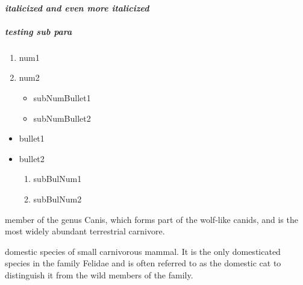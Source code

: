 \documentclass[a4paper, 12pt]{report}
\begin{document}
\paragraph{\textit{italicized and even more \textit{italicized}}}
\subparagraph{testing sub para}

\begin{enumerate}
    \item num1
    \item num2
    \begin{itemize}
        \item subNumBullet1
        \item subNumBullet2
    \end{itemize}
\end{enumerate}

\begin{itemize}
    \item bullet1
    \item bullet2
        \begin{enumerate}
            \item subBulNum1
            \item subBulNum2
        \end{enumerate}
\end{itemize}

\begin{description}
\item 
\item[Dog:] member of the genus Canis, which forms part of the wolf-like canids,
  and is the most widely abundant terrestrial carnivore.
\item[Cat:] domestic species of small carnivorous mammal. It is the only
  domesticated species in the family Felidae and is often referred to as the
  domestic cat to distinguish it from the wild members of the family.
\end{description}
\end{document}
